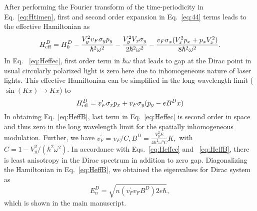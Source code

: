 \documentclass[aps,pra,preprint,showpacs]{revtex4-1}
\begin{document}
After performing the Fourier transform of the time-periodicity in Eq.~\eqref{eq:Htimen}, first and second order expansion in Eq.~\eqref{eq:44} terms leads to the  effective Hamiltonian as
\begin{equation} \label{eq:Heffec}
	H_{\rm eff}^D=H_{0}^D-\frac{V_{y}^{2}v_F\sigma_{y}p_{y}}{\hbar^{2}\omega^{2}}
	-\frac{V_{y}^{2}V_{x}\sigma_{y}}{2\hbar^{2}\omega^{2}}-\frac{v_F\sigma
		_{x}(V_{x}^{2}p_{x}+p_{x}V_{x}^{2})}{8\hbar^{2}\omega^{2}}.
\end{equation}
In Eq. ~\eqref{eq:Heffec}, first order term in $\hbar \omega$ that leads to gap at the Dirac point in usual circularly polarized light \cite{AEE, MBL} is zero here due to inhomogeneous nature of laser lights. This effective Hamiltonian can be simplified in the long wavelength limit ($\sin(Kx) \rightarrow Kx$) to
\begin{equation} \label{eq:HeffB}
	H_{\rm eff}^D = v_{F}^{\prime}\sigma_{x}p_{x}+v_F\sigma_{y}(p_{y}-eB^Dx)
\end{equation}%
In obtaining Eq.~\eqref{eq:HeffB}, last term in Eq.~\eqref{eq:Heffec} is second order in space and thus zero in the long wavelength limit for the spatially inhomogeneous modulation. Further, we have $v_{F}^{\prime}=v_F/C,B^D=\frac{V_{y}^{2}E}{4\hbar^{2}\omega^{3}C}K,$ with $C=1-V_{y}^{2}/(\hbar^{2}\omega^{2})$. In accordance with Eqs.~\eqref{eq:Heffec} and ~\eqref{eq:HeffB}, there is least anisotropy in the Dirac spectrum in addition to zero gap. Diagonalizing the Hamiltonian in Eq.~\eqref{eq:HeffB}, we obtained the eigenvalues for Dirac system as%
\begin{equation} \label{eq:DiracEner}
	E_{n}^D=\sqrt{n(v_{F}^{\prime}v_FB^D)2e\hbar},
\end{equation}
which is shown in the main manuscript.
\end{document}
